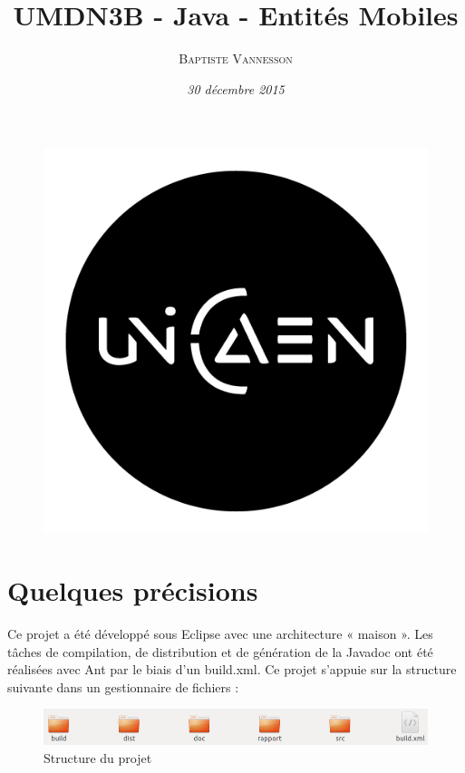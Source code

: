 \documentclass[a4paper,10pt]{report}
\title{\textbf{UMDN3B - Java - Entités Mobiles}}
\author{\textsc{Baptiste Vannesson}}
\date{\textit{30 décembre 2015}}
\begin{document}
\begin{figure}
 \begin{center}
  \includegraphics[scale=.3]{Co_Unicaen.png}
 \end{center}
\end{figure}
\maketitle

\section*{Quelques précisions}

Ce projet a été développé sous Eclipse avec une architecture « maison ». Les tâches de compilation, de distribution et de génération de la Javadoc ont été réalisées avec Ant par le biais d'un build.xml. Ce projet s'appuie sur la structure suivante dans un gestionnaire de fichiers :

\begin{figure}[h]
 \begin{center}
  \includegraphics[scale=.4]{projet.png}
 \end{center}
 \caption{Structure du projet}
\end{figure}
\end{document}
